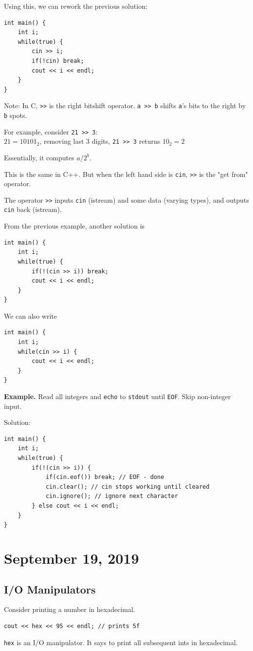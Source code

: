 \documentclass[11pt]{article}
\theoremstyle{definition}
\begin{document}
Using this, we can rework the previous solution:
\begin{lstlisting}
int main() {
    int i;
    while(true) {
        cin >> i;
        if(!cin) break;
        cout << i << endl;
    }
}
\end{lstlisting}
Note: In C, {\tt >\null>} is the right bitshift operator. {\tt a >\null> b} shifts {\tt a}'s bits to the right by {\tt b} spots. 

For example, consider {\tt 21 >\null> 3}: \\
$21 = 10101_2$, removing last 3 digits, {\tt 21 >\null> 3} returns $10_2 = 2$

Essentially, it computes $a / 2^b$.

This is the same in C++. But when the left hand side is {\tt cin}, {\tt >\null>} is the "get from" operator. 

The operator {\tt >\null>} inputs {\tt cin} (istream) and some data (varying types), and outputs {\tt cin} back (istream).

From the previous example, another solution is
\begin{lstlisting}
int main() {
    int i;
    while(true) {
        if(!(cin >> i)) break;
        cout << i << endl;
    }
}
\end{lstlisting}
We can also write
\begin{lstlisting}
int main() {
    int i;
    while(cin >> i) {
        cout << i << endl;
    }
}
\end{lstlisting}

{\bf Example.} Read all integers and {\tt echo} to {\tt stdout} until {\tt EOF}. Skip non-integer input.

Solution:
\begin{lstlisting}
int main() {
    int i;
    while(true) {
        if(!(cin >> i)) {
            if(cin.eof()) break; // EOF - done
            cin.clear(); // cin stops working until cleared
            cin.ignore(); // ignore next character
        } else cout << i << endl;
    }
}
\end{lstlisting}
\newpage
\section{September 19, 2019}

\subsection{I/O Manipulators}
Consider printing a number in hexadecimal.
\begin{lstlisting}
cout << hex << 95 << endl; // prints 5f
\end{lstlisting}
{\tt hex} is an I/O manipulator. It says to print all subsequent ints in hexadecimal. 
\end{document}
